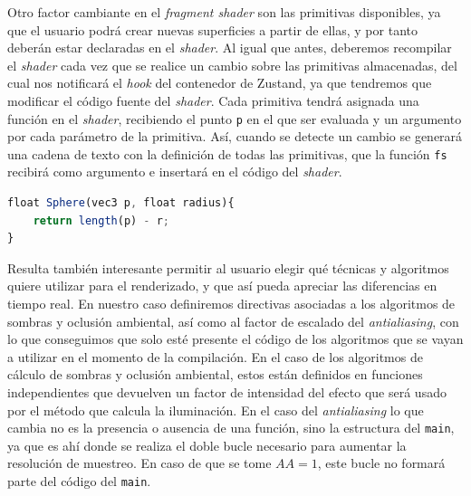Otro factor cambiante en el \textit{fragment shader} son las primitivas disponibles, ya que el usuario podrá crear nuevas superficies a partir de ellas, y por tanto deberán estar declaradas en el \textit{shader}. Al igual que antes, deberemos recompilar el \textit{shader} cada vez que se realice un cambio sobre las primitivas almacenadas, del cual nos notificará el \textit{hook} del contenedor de Zustand, ya que tendremos que modificar el código fuente del \textit{shader}. Cada primitiva tendrá asignada una función en el \textit{shader}, recibiendo el punto \texttt{p} en el que ser evaluada y un argumento por cada parámetro de la primitiva. Así, cuando se detecte un cambio se generará una cadena de texto con la definición de todas las primitivas, que la función \texttt{fs} recibirá como argumento e insertará en el código del \textit{shader}.\newline
\begin{lstlisting}[language=JavaScript, caption=Ejemplo de declaración de primitiva]
float Sphere(vec3 p, float radius){
    return length(p) - r;
}
\end{lstlisting}
Resulta también interesante permitir al usuario elegir qué técnicas y algoritmos quiere utilizar para el renderizado, y que así pueda apreciar las diferencias en tiempo real. En nuestro caso definiremos directivas asociadas a los algoritmos de sombras y oclusión ambiental, así como al factor de escalado del \textit{antialiasing}, con lo que conseguimos que solo esté presente el código de los algoritmos que se vayan a utilizar en el momento de la compilación. En el caso de los algoritmos de cálculo de sombras y oclusión ambiental, estos están definidos en funciones independientes que devuelven un factor de intensidad del efecto que será usado por el método que calcula la iluminación. En el caso del \textit{antialiasing} lo que cambia no es la presencia o ausencia de una función, sino la estructura del \texttt{main}, ya que es ahí donde se realiza el doble bucle necesario para aumentar la resolución de muestreo. En caso de que se tome $AA=1$, este bucle no formará parte del código del \texttt{main}.\newline


